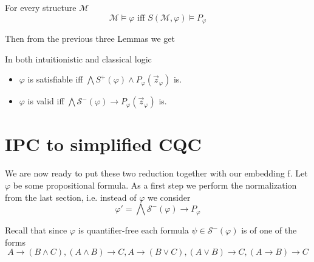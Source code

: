 \documentclass[a4paper,UKenglish,cleveref, autoref, thm-restate]{lipics-v2021}
\begin{document}
\begin{lemma}
	For every structure $\mathcal M$
	$$\mathcal M\models \varphi\text{ iff }S(\mathcal M, \varphi)\models P_\varphi$$
\end{lemma}

Then from the previous three Lemmas we get

\begin{corollary}\label{equivalid}
	In both intuitionistic and classical logic
	\begin{itemize}
		\item $\varphi$ is satisfiable iff $\mathcal \bigwedge S^+(\varphi)\wedge P_\varphi(\vec z_\varphi)$ is.
		\item $\varphi$ is valid iff $\bigwedge\mathcal S^-(\varphi)\to P_\varphi(\vec z_\varphi)$ is.
	\end{itemize}
\end{corollary}

\section{IPC to simplified CQC}

We are now ready to put these two reduction together with our embedding f. Let $\varphi$ be some propositional formula. As a first step we perform the normalization from the last section, i.e. instead of $\varphi$ we consider $$\varphi' = \bigwedge \mathcal S^-(\varphi)\to P_\varphi$$

Recall that since $\varphi$ is quantifier-free each formula $\psi\in\mathcal S^-(\varphi)$ is of one of the forms
$$A\to (B\wedge C), (A\wedge B)\to C, A\to (B\vee C), (A\vee B)\to C, (A\to B)\to C$$
\end{document}
